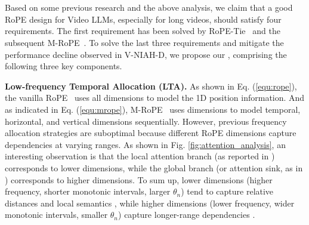 \section{\methodname}\label{subsec:step_size}

Based on some previous research and the above analysis, we claim that a good RoPE design for Video LLMs, especially for long videos, should satisfy four requirements.
The first requirement has been solved by RoPE-Tie~\cite{kexuefm10040} and the subsequent M-RoPE~\cite{wang2024qwen2}.
To solve the last three requirements and mitigate the performance decline observed in V-NIAH-D, we propose our \methodname, comprising the following three key components.

\noindent \textbf{Low-frequency Temporal Allocation (LTA).} 
As shown in Eq. (\ref{equ:rope}), the vanilla RoPE~\cite{su2024roformer} uses all dimensions to model the 1D position information. And as indicated in Eq. (\ref{equ:mrope}), M-RoPE~\cite{wang2024qwen2} uses dimensions to model temporal, horizontal, and vertical dimensions sequentially.
However, previous frequency allocation strategies are suboptimal because different RoPE dimensions capture dependencies at varying ranges.
As shown in Fig.  \ref{fig:attention_analysis}, an interesting observation is that the local attention branch (as reported in \cite{han2024lm}) corresponds to lower dimensions, while the global branch (or attention sink, as in \cite{xiao2023efficient}) corresponds to higher dimensions.
To sum up, lower dimensions (higher frequency, shorter monotonic intervals, larger $\theta_n$) tend to capture relative distances and local semantics \cite{men2024base,barbero2024round}, while higher dimensions (lower frequency, wider monotonic intervals, smaller $\theta_n$) capture longer-range dependencies \cite{barbero2024round}.

